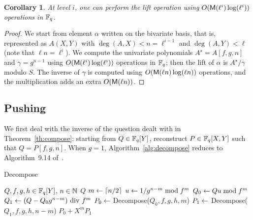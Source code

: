 \documentclass{sig-alternate}
\newtheorem{corollary}[definition]{Corollary}
\begin{document}
\begin{corollary}
  At level $i$, one can perform the lift operation using
  $O(\mathsf{M}(\ell^i)\log(\ell^i))$ operations in $\mathbb{F}_q$.
\end{corollary}
\begin{proof}
  We start from element $\alpha$ written on the bivariate basis, that
  is, represented as $A(X,Y)$ with $\deg(A,X)<n=\ell^{i-1}$ and
  $\deg(A,Y)<\ell$ (note that $\ell n =\ell^i$).  We compute the
  univariate polynomials $A^\star=A[f,g,n]$ and $\gamma=g^{n-1}$ using
  $O(\mathsf{M}(\ell^i)\log(\ell^i))$ operations in $\mathbb{F}_q$; then the lift
  of $\alpha$ is $A^\star/\gamma$ modulo $S$. The inverse of $\gamma$
  is computed using $O(\mathsf{M}(\ell n)\log(\ell n))$ operations, and the
  multiplication adds an extra $O(\mathsf{M}(\ell n))$.
\end{proof}


\subsection{Pushing}

We first deal with the inverse of the question dealt with in
Theorem~\ref{th:compose}: starting from $Q \in \mathbb{F}_q[Y]$, reconstruct
$P \in \mathbb{F}_q[X,Y]$ such that $Q=P[f,g,n]$. When $g=1$,
Algorithm~\ref{alg:decompose} reduces to Algorithm~9.14
of~\cite{vzGG}.

\begin{algorithm}[t]
  \caption{Decompose}
  \label{alg:decompose}
  \begin{algorithmic}[1]
    \REQUIRE $Q,f,g,h\in \mathbb{F}_q[Y]$, $n \in \mathbb{N}$ 
    \RETURN $Q$
    \ELSE 
    \STATE $m \leftarrow \lceil n/2 \rceil$ 
    \STATE $u \leftarrow 1/ g^{n-m}\bmod f^m$ \label{alg:decompose:xgcd} 
    \STATE $Q_0 \leftarrow Q u \bmod f^m$ 
    \STATE $Q_1 \leftarrow (Q-Q_0 g^{n-m}) {\rm~div~} f^m$ 
    \STATE $P_0 \leftarrow$ Decompose($Q_0, f, g, h, m$) 
    \STATE $P_1 \leftarrow$ Decompose($Q_1, f, g, h, n-m$) 
    \RETURN $P_0 + X^m P_1$ 
    \ENDIF
  \end{algorithmic}
\end{algorithm}
\end{document}
